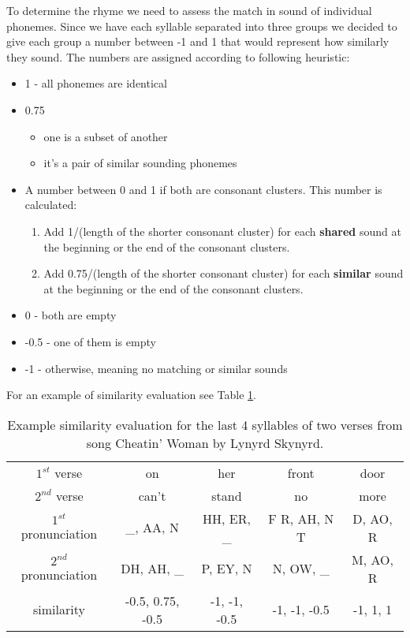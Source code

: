 To determine the rhyme we need to assess the match in sound of individual phonemes. Since we have each syllable separated into three groups we decided to give each group a number between -1 and 1 that would represent how similarly they sound. The numbers are assigned according to following heuristic:
\begin{itemize}
	\item 1 - all phonemes are identical
	\item 0.75
	\begin{itemize}
		\item one is a subset of another
		\item it's a pair of similar sounding phonemes
	\end{itemize}
	\item A number between 0 and 1 if both are consonant clusters. This number is calculated:
	\begin{enumerate}
		\item Add 1/(length of the shorter consonant cluster) for each \textbf{shared} sound at the beginning or the end of the consonant clusters.
		\item Add 0.75/(length of the shorter consonant cluster) for each \textbf{similar} sound at the beginning or the end of the consonant clusters.
	\end{enumerate}
	\item 0 - both are empty
	\item -0.5 - one of them is empty
	\item -1 - otherwise, meaning no matching or similar sounds
	
\end{itemize}

For an example of similarity evaluation see Table \ref{similarity_eval_table}.

\begin{table}[h!]
	\centering
	\begin{tabular}{c | c c c c} 
		$1^{st}$ verse & on & her & front & door \\ [0.5ex] 
		$2^{nd}$ verse & can't & stand & no & more \\ 
		\hline
		$1^{st}$ pronunciation & \_, AA, N & HH, ER, \_ & F R, AH, N T & D, AO, R \\
		$2^{nd}$ pronunciation & DH, AH, \_ & P, EY, N & N, OW, \_ & M, AO, R \\
		\hline
		similarity & -0.5, 0.75, -0.5 & -1, -1, -0.5 & -1, -1, -0.5 & -1, 1, 1 \\
	\end{tabular}
	\caption{Example similarity evaluation for the last 4 syllables of two verses from song Cheatin' Woman by Lynyrd Skynyrd.}
	\label{similarity_eval_table}
\end{table}

